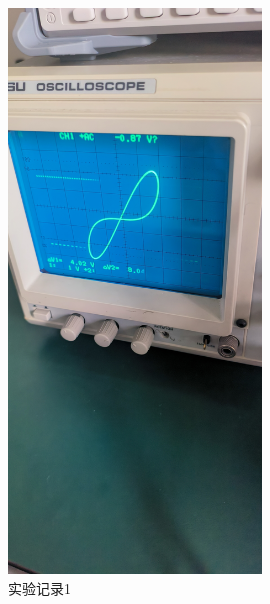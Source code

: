 \documentclass{ctexart}
\begin{document}
\begin{figure}[H]
  \centering
  \includegraphics[width=0.6\textwidth,height=0.3\textheight]{shiyanjilu1.jpg}
  \caption{实验记录1}
\end{figure}
\end{document}
